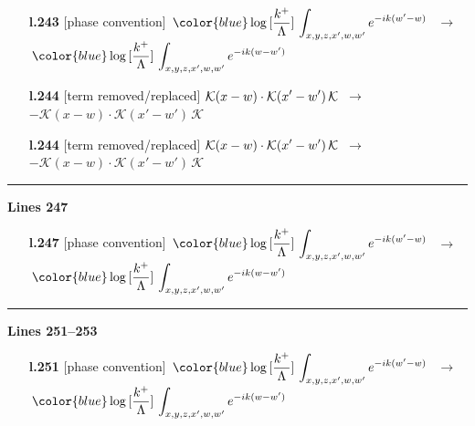 \documentclass[10pt]{article}
\begin{document}
\begin{itemize}[leftmargin=2.2em,itemsep=1pt,topsep=2pt]
\item[\textbf{l.243}] \textsf{\small [phase convention]} $\displaystyle \, {\color{blue}\log{[\frac{k^{+}}{\Lambda}]}}\, \int_{x,y,z,x^{\prime},w,w^{\prime}}e^{-ik(w^{\prime}-w)}\,$\ $\longrightarrow$\ $\displaystyle \, {\color{blue}\log{[\frac{k^{+}}{\Lambda}]}}\, \int_{x,y,z,x^{\prime},w,w^{\prime}}e^{-ik(w-w^{\prime})}\,$
\item[\textbf{l.244}] \textsf{\small [term removed/replaced]} $\displaystyle \-\mathcal{K}(x-w)\cdot\mathcal{K}(x'-w')\,\mathcal{K}$\ $\longrightarrow$\ $\displaystyle -\mathcal{K}(x-w)\cdot\mathcal{K}(x'-w')\,\mathcal{K}$
\item[\textbf{l.244}] \textsf{\small [term removed/replaced]} $\displaystyle \-\mathcal{K}(x-w)\cdot\mathcal{K}(x'-w')\,\mathcal{K}$\ $\longrightarrow$\ $\displaystyle -\mathcal{K}(x-w)\cdot\mathcal{K}(x'-w')\,\mathcal{K}$
\end{itemize}
\noindent\rule{\linewidth}{0.3pt}\par\noindent\textbf{Lines 247} \par
\begin{itemize}[leftmargin=2.2em,itemsep=1pt,topsep=2pt]
\item[\textbf{l.247}] \textsf{\small [phase convention]} $\displaystyle \, {\color{blue}\log{[\frac{k^{+}}{\Lambda}]}}\,\int_{x,y,z,x^{\prime},w,w^{\prime}}e^{-ik(w^{\prime}-w)}\,$\ $\longrightarrow$\ $\displaystyle \, {\color{blue}\log{[\frac{k^{+}}{\Lambda}]}}\,\int_{x,y,z,x^{\prime},w,w^{\prime}}e^{-ik(w-w^{\prime})}\,$
\end{itemize}
\noindent\rule{\linewidth}{0.3pt}\par\noindent\textbf{Lines 251--253} \par
\begin{itemize}[leftmargin=2.2em,itemsep=1pt,topsep=2pt]
\item[\textbf{l.251}] \textsf{\small [phase convention]} $\displaystyle \, {\color{blue}\log{[\frac{k^{+}}{\Lambda}]}}\,\int_{x,y,z,x^{\prime},w,w^{\prime}}e^{-ik(w^{\prime}-w)}\,$\ $\longrightarrow$\ $\displaystyle \, {\color{blue}\log{[\frac{k^{+}}{\Lambda}]}}\,\int_{x,y,z,x^{\prime},w,w^{\prime}}e^{-ik(w-w^{\prime})}\,$
\end{itemize}
\end{document}
